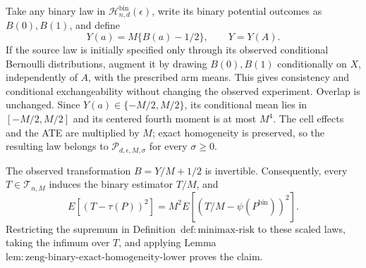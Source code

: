 Take any binary law in \(\mathcal H_{n,d}^{\mathrm{bin}}(\epsilon)\), write its binary potential outcomes as \(B(0),B(1)\), and define
\[
 Y(a)=M\{B(a)-1/2\},\qquad Y=Y(A).
\tag{1}
\]
If the source law is initially specified only through its observed conditional Bernoulli distributions, augment it by drawing \(B(0),B(1)\) conditionally on \(X\), independently of \(A\), with the prescribed arm means.  This gives consistency and conditional exchangeability without changing the observed experiment.  Overlap is unchanged.  Since \(Y(a)\in\{-M/2,M/2\}\), its conditional mean lies in \([-M/2,M/2]\) and its centered fourth moment is at most \(M^4\).  The cell effects and the ATE are multiplied by \(M\); exact homogeneity is preserved, so the resulting law belongs to \(\mathcal P_{d,\epsilon,M,\sigma}\) for every \(\sigma\ge0\).

The observed transformation \(B=Y/M+1/2\) is invertible.  Consequently, every \(T\in\mathcal T_{n,M}\) induces the binary estimator \(T/M\), and
\[
 E[(T-\tau(P))^2]=M^2E[(T/M-\psi(P^{\mathrm{bin}}))^2].
\tag{2}
\]
Restricting the supremum in Definition~\(\mathrm{def:minimax\text{-}risk}\) to these scaled laws, taking the infimum over \(T\), and applying Lemma~\(\mathrm{lem:zeng\text{-}binary\text{-}exact\text{-}homogeneity\text{-}lower}\) proves the claim.